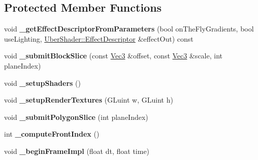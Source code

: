 \subsection*{\-Protected \-Member \-Functions}
\begin{DoxyCompactItemize}
\item 
\hypertarget{class_verdi_1_1_tex_slice_strategy_aaee8978a91e5ee226ea7d034fe66ac6f}{void {\bfseries \-\_\-get\-Effect\-Descriptor\-From\-Parameters} (bool on\-The\-Fly\-Gradients, bool use\-Lighting, \hyperlink{struct_verdi_1_1_uber_shader_1_1_effect_descriptor}{\-Uber\-Shader\-::\-Effect\-Descriptor} \&effect\-Out) const }\label{class_verdi_1_1_tex_slice_strategy_aaee8978a91e5ee226ea7d034fe66ac6f}

\item 
\hypertarget{class_verdi_1_1_tex_slice_strategy_a90e76c6ba380078acdca4643ce3bd411}{void {\bfseries \-\_\-submit\-Block\-Slice} (const \hyperlink{class_verdi_1_1_vec3}{\-Vec3} \&offset, const \hyperlink{class_verdi_1_1_vec3}{\-Vec3} \&scale, int plane\-Index)}\label{class_verdi_1_1_tex_slice_strategy_a90e76c6ba380078acdca4643ce3bd411}

\item 
\hypertarget{class_verdi_1_1_tex_slice_strategy_a85908bd6e43390b2c7f2229fc1c0e68f}{void {\bfseries \-\_\-setup\-Shaders} ()}\label{class_verdi_1_1_tex_slice_strategy_a85908bd6e43390b2c7f2229fc1c0e68f}

\item 
\hypertarget{class_verdi_1_1_tex_slice_strategy_adee2ac00b032b4ffbe341b3843dde607}{void {\bfseries \-\_\-setup\-Render\-Textures} (\-G\-Luint w, \-G\-Luint h)}\label{class_verdi_1_1_tex_slice_strategy_adee2ac00b032b4ffbe341b3843dde607}

\item 
\hypertarget{class_verdi_1_1_tex_slice_strategy_a5c443dca994201178cc749e0d8ee546c}{void {\bfseries \-\_\-submit\-Polygon\-Slice} (int plane\-Index)}\label{class_verdi_1_1_tex_slice_strategy_a5c443dca994201178cc749e0d8ee546c}

\item 
\hypertarget{class_verdi_1_1_tex_slice_strategy_a5902c968c8149ea3f641838130994949}{int {\bfseries \-\_\-compute\-Front\-Index} ()}\label{class_verdi_1_1_tex_slice_strategy_a5902c968c8149ea3f641838130994949}

\item 
\hypertarget{class_verdi_1_1_tex_slice_strategy_a1ce15e4fa941f69d93624b80888d3258}{void {\bfseries \-\_\-begin\-Frame\-Impl} (float dt, float time)}\label{class_verdi_1_1_tex_slice_strategy_a1ce15e4fa941f69d93624b80888d3258}


\end{DoxyCompactItemize}
